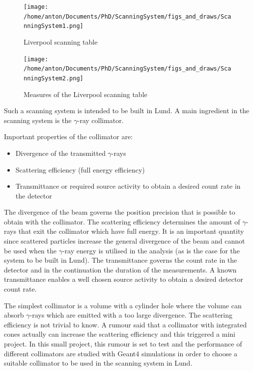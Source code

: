 \documentclass[a4paper]{article}
\begin{document}
\begin{figure}[H]
  \centering
  \texttt{[image: /home/anton/Documents/PhD/ScanningSystem/figs\_and\_draws/ScanningSystem1.png]}
  \caption{Liverpool scanning table \cite{phd:Dimmock}}
  \label{fig:livScanning}
\end{figure}

\begin{figure}[H]
  \centering
  \texttt{[image: /home/anton/Documents/PhD/ScanningSystem/figs\_and\_draws/ScanningSystem2.png]}
  \caption{Measures of the Liverpool scanning table \cite{phd:Dimmock}}
  \label{fig:livScanning2}
\end{figure}

Such a scanning system is intended to be built in Lund.
A main ingredient in the scanning system is the $\gamma$-ray collimator.

Important properties of the collimator are:
\begin{itemize}
  \item Divergence of the transmitted $\gamma$-rays
  \item Scattering efficiency (full energy efficiency)
  \item Transmittance or required source activity to obtain a desired count rate in the detector
\end{itemize}
The divergence of the beam governs the position precision that is possible to obtain with the collimator. The scattering efficiency determines the amount of $\gamma$-rays that exit the collimator which have full energy. It is an important quantity since scattered particles increase the general divergence of the beam and cannot be used when the $\gamma$-ray energy is utilised in the analysis (as is the case for the system to be built in Lund). The transmittance governs the count rate in the detector and in the continuation the duration of the measurements. A known transmittance enables a well chosen source activity to obtain a desired detector count rate.

The simplest collimator is a volume with a cylinder hole where the volume can absorb $\gamma$-rays which are emitted with a too large divergence.
The scattering efficiency is not trivial to know.
A rumour said that a collimator with integrated cones actually can increase the scattering efficiency and this triggered a mini project.
In this small project, this rumour is set to test and the performance of different collimators are studied with Geant4 simulations in order to choose a suitable collimator to be used in the scanning system in Lund.
\end{document}
